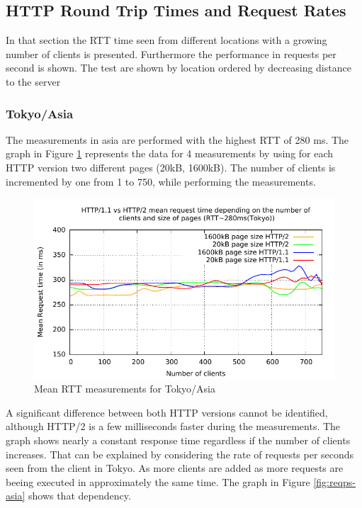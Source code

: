 \subsection{HTTP Round Trip Times and Request Rates}
\label{subsec:rtt}

In that section the RTT time seen from different locations with a growing number of clients is presented. Furthermore the performance in requests per second is shown. The test are shown by location ordered by decreasing distance to the server

\subsubsection{Tokyo/Asia}

The measurements in asia are performed with the highest RTT of 280 ms. The graph in Figure \ref{fig:latency-asia}  represents the data for 4 measurements by using for each HTTP version two different pages (20kB, 1600kB). The number of clients is incremented by one  from 1 to 750, while performing the measurements.

\begin{figure}[H]
	\centering
	\includegraphics[scale=1,trim=0.0cm .0cm .0cm .0cm,clip]{images/latency-asia.pdf}
	\caption{Mean RTT measurements for Tokyo/Asia}
	\label{fig:latency-asia}
\end{figure}

A significant difference between both HTTP versions cannot be identified, although HTTP/2 is a few milliseconds faster during the measurements. The graph shows nearly a constant response time regardless if the number of clients increases. That can be explained by considering the rate of requests per seconds seen from the client in Tokyo. As more clients are added as more requests are beeing executed in approximately the same time. The graph in Figure \ref{fig:reqps-asia} shows that dependency.

